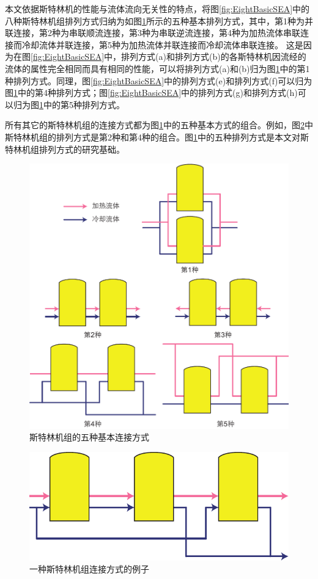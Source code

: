 本文依据斯特林机的性能与流体流向无关性的特点，将图\ref{fig:EightBasicSEA}中的八种斯特林机组排列方式归纳为如图\ref{fig:SEA}所示的五种基本排列方式，其中，第1种为并联连接，第2种为串联顺流连接，第3种为串联逆流连接，第4种为加热流体串联连接而冷却流体并联连接，第5种为加热流体并联连接而冷却流体串联连接。
这是因为在图\ref{fig:EightBasicSEA}中，排列方式(a)和排列方式(b)的各斯特林机因流经的流体的属性完全相同而具有相同的性能，可以将排列方式(a)和(b)归为图\ref{fig:SEA}中的第1种排列方式。同理，图\ref{fig:EightBasicSEA}中的排列方式(e)和排列方式(f)可以归为图\ref{fig:SEA}中的第4种排列方式；图\ref{fig:EightBasicSEA}中的排列方式(g)和排列方式(h)可以归为图\ref{fig:SEA}中的第5种排列方式。

所有其它的斯特林机组的连接方式都为图\ref{fig:SEA}中的五种基本方式的组合。例如，图\ref{fig:SEA_eg}中斯特林机组的排列方式是第2种和第4种的组合。图\ref{fig:SEA}中的五种排列方式是本文对斯特林机组排列方式的研究基础。

\noindent \begin{figure}[htbp]
\begin{center}
	\includegraphics[width = 0.45\columnwidth]{fig/BasicSEA}
	\caption{斯特林机组的五种基本连接方式}
	\label{fig:SEA}
\end{center}
\end{figure}

\noindent \begin{figure}[htbp]
\begin{center}
	\includegraphics[width = 0.3\columnwidth]{fig/SEA_eg}
	\caption{一种斯特林机组连接方式的例子}
	\label{fig:SEA_eg}
\end{center}
\end{figure}

